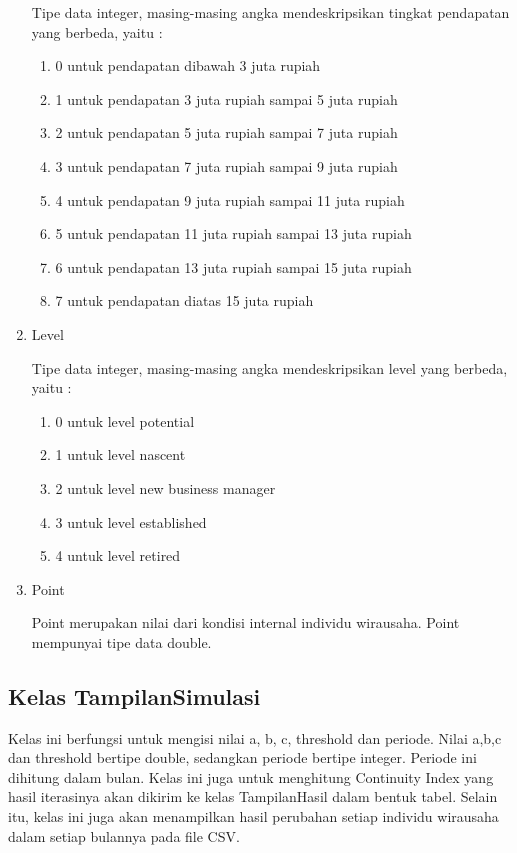 \begin{enumerate}
		
		Tipe data integer, masing-masing angka mendeskripsikan tingkat pendapatan yang berbeda, yaitu :
		\begin{enumerate}
			\item 0 untuk pendapatan dibawah 3 juta rupiah
			\item 1 untuk pendapatan 3 juta rupiah sampai 5 juta rupiah
			\item 2 untuk pendapatan 5 juta rupiah sampai 7 juta rupiah
			\item 3 untuk pendapatan 7 juta rupiah sampai 9 juta rupiah
			\item 4 untuk pendapatan 9 juta rupiah sampai 11 juta rupiah
			\item 5 untuk pendapatan 11 juta rupiah sampai 13 juta rupiah
			\item 6 untuk pendapatan 13 juta rupiah sampai 15 juta rupiah
			\item 7 untuk pendapatan diatas 15 juta rupiah
		\end{enumerate}
		\item Level
		
		
		Tipe data integer, masing-masing angka mendeskripsikan level yang berbeda, yaitu :
		\begin{enumerate}
			\item 0 untuk level potential
			\item 1 untuk level nascent
			\item 2 untuk level new business manager
			\item 3 untuk level established 
			\item 4 untuk level retired
		\end{enumerate}
		\item Point
		
		
		Point merupakan nilai dari kondisi internal individu wirausaha. Point mempunyai tipe data double.
\end{enumerate}

\subsection{Kelas TampilanSimulasi}
Kelas ini berfungsi untuk mengisi nilai a, b, c, threshold dan periode. Nilai a,b,c dan threshold bertipe double, sedangkan periode bertipe integer. Periode ini dihitung dalam bulan. Kelas ini juga untuk menghitung Continuity Index yang hasil iterasinya akan dikirim ke kelas TampilanHasil dalam bentuk tabel. Selain itu, kelas ini juga akan menampilkan hasil perubahan setiap individu wirausaha dalam setiap bulannya pada file CSV.

